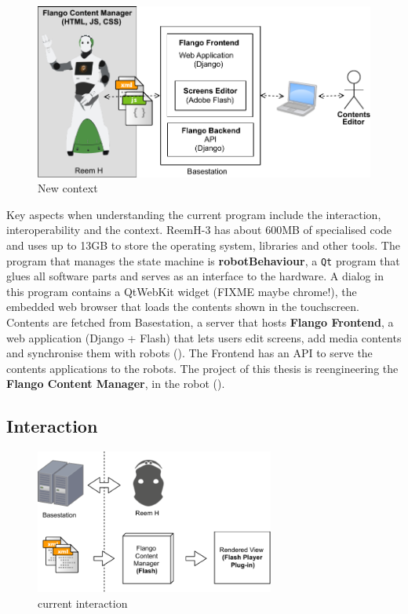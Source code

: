 \begin{figure}[htb]
    \label{fig:context-new}
    \centering
    \includegraphics[width=\textwidth]{figures/context-new}
    \caption{New context}
\end{figure}

Key aspects when understanding the current program include the interaction, interoperability and the context.
ReemH-3 has about 600MB of specialised code and uses up to 13GB to store the operating system, libraries and other tools.
The program that manages the state machine is \textbf{robotBehaviour}, a \texttt{Qt} program that glues all software parts and serves as an interface to the hardware.
A dialog in this program contains a QtWebKit widget (FIXME maybe chrome!), the embedded web browser that loads the contents shown in the touchscreen.
Contents are fetched from Basestation, a server that hosts \textbf{Flango Frontend}, a web application (Django + Flash) that lets users edit screens, add media contents and synchronise them with robots ().
The Frontend has an \ac{API} to serve the contents applications to the robots.
The project of this thesis is reengineering the \textbf{Flango Content Manager}, in the robot ().

\subsection{Interaction}
\begin{figure}[htb]
    \label{fig:interaction-original}
    \centering
    \includegraphics[width=0.7\textwidth]{figures/interaction-original}
    \caption{current interaction}
\end{figure}

